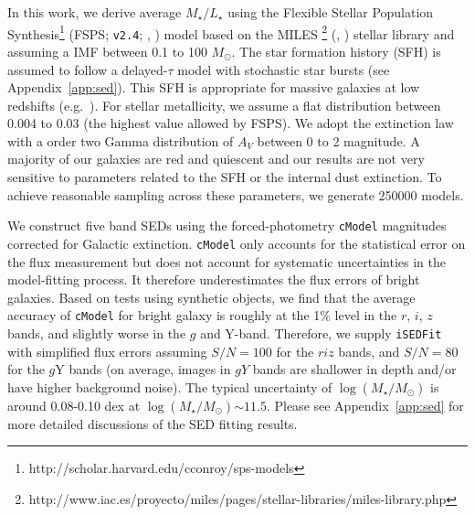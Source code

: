 \documentclass[a4paper,fleqn,usenatbib]{mnras}
\def\msun{$M_\odot$}
\def\cmodel{\texttt{cModel}}
\def\logms{{$\log (M_{\star}/M_{\odot})$}}
\def\m2l{{$M_{\star}/L_{\star}$}}
\begin{document}
    In this work, we derive average \m2l{} using the Flexible Stellar Population 
    Synthesis\footnote{http://scholar.harvard.edu/cconroy/sps-models}
    (FSPS; \texttt{v2.4}; \citealt{FSPS}, \citealt{Conroy2010}) model based on the MILES
    \footnote{http://www.iac.es/proyecto/miles/pages/stellar-libraries/miles-library.php}
    (\citealt{MILES1}, \citealt{MILES2}) stellar library and assuming a
    \citet{Chabrier2003} IMF between 0.1 to 100 \msun. 
    The star formation history (SFH) is assumed to follow a delayed-$\tau$ model with 
    stochastic star bursts (see Appendix~\ref{app:sed}). 
    This SFH is appropriate for massive galaxies at low redshifts 
    (e.g.\ \citealt{Kauffmann2003}). 
    For stellar metallicity, we assume a flat distribution between 0.004 to 0.03 
    (the highest value allowed by FSPS). 
    We adopt the \citet{Calzetti2000} extinction law with a order two Gamma distribution 
    of $A_{V}$ between 0 to 2 magnitude. 
    A majority of our galaxies are red and quiescent and our results are 
    not very sensitive to parameters related to the SFH or the internal dust extinction. 
    To achieve reasonable sampling across these parameters, we generate 250000 models. 
    
    We construct five band SEDs using the forced-photometry \cmodel{} magnitudes 
    corrected for Galactic extinction. 
    \cmodel{} only accounts for the statistical error on the flux measurement but does
    not account for systematic uncertainties in the model-fitting process. 
    It therefore underestimates the flux errors of bright galaxies. 
    Based on tests using synthetic objects, we find that the average accuracy of
    \cmodel{} for bright galaxy is roughly at the 1\% level in the $r$, $i$, $z$ bands, 
    and slightly worse in the $g$ and Y-band. 
    Therefore, we supply \texttt{iSEDFit} with simplified flux errors assuming 
    $S/N = 100$ for the $riz$ bands, and $S/N = 80$ for the $g$Y bands (on average, 
    images in $gY$ bands are shallower in depth and/or have higher background noise).  
    The typical uncertainty of \logms{} is around 0.08-0.10 dex at \logms$\sim 11.5$. 
    Please see Appendix~\ref{app:sed} for more detailed discussions of the SED fitting
    results.  
\end{document}
